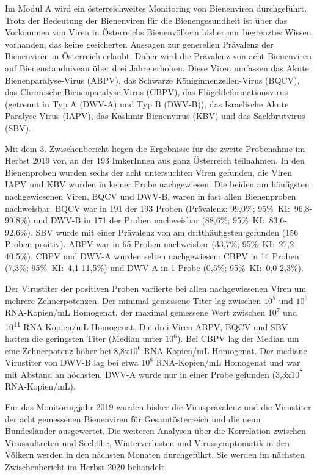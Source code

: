 Im Modul A wird ein österreichweites Monitoring von Bienenviren durchgeführt. Trotz der Bedeutung der Bienenviren für die Bienengesundheit ist über das Vorkommen von Viren in Österreichs Bienenvölkern bisher nur begrenztes Wissen vorhanden, das keine gesicherten Aussagen zur generellen Prävalenz der Bienenviren in Österreich erlaubt. Daher wird die Prävalenz von acht Bienenviren auf Bienenstandniveau über drei Jahre erhoben. Diese Viren umfassen das Akute Bienenparalyse-Virus (ABPV), das Schwarze Königinnenzellen-Virus (BQCV), das Chronische Bienenparalyse-Virus (CBPV), das Flügeldeformationsvirus (getrennt in Typ A (DWV-A) und Typ B (DWV-B)), das Israelische Akute Paralyse-Virus (IAPV), das Kashmir-Bienenvirus (KBV) und das Sackbrutvirus (SBV). 

Mit dem 3. Zwischenbericht liegen die Ergebnisse für die zweite Probenahme im Herbst 2019 vor, an der 193 ImkerInnen aus ganz Österreich teilnahmen. In den Bienenproben wurden sechs der acht untersuchten Viren gefunden, die Viren IAPV und KBV wurden in keiner Probe nachgewiesen. Die beiden am häufigsten nachgewiesenen Viren, BQCV und DWV-B, waren in fast allen Bienenproben nachweisbar. BQCV war in 191 der 193 Proben (Prävalenz: 99,0\%; 95\%~KI:~96,8-99,8\%) und DWV-B in 171 der Proben nachweisbar (88,6\%; 95\%~KI:~83,6-92,6\%). SBV wurde mit einer Prävalenz von   am dritthäufigsten gefunden (156 Proben positiv). ABPV war in 65 Proben nachweisbar (33,7\%; 95\%~KI:~27,2-40,5\%). CBPV und DWV-A wurden selten nachgewiesen: CBPV in 14 Proben (7,3\%; 95\%~KI:~4,1-11,5\%) und DWV-A in 1 Probe (0,5\%; 95\%~KI:~0,0-2,3\%). 

Der Virustiter der positiven Proben variierte bei allen nachgewiesenen Viren um mehrere Zehnerpotenzen. Der minimal gemessene Titer lag zwischen $10^5$ und $10^9$ RNA-Kopien/\si{\milli\liter} Homogenat, der maximal gemessene Wert zwischen $10^7$ und 10\textsuperscript{11} RNA-Kopien/\si{\milli\liter} Homogenat. Die drei Viren ABPV, BQCV und SBV hatten die geringsten Titer (Median unter $10^6$). Bei CBPV lag der Median um eine Zehnerpotenz höher bei 8,8x$10^6$ RNA-Kopien/\si{\milli\liter} Homogenat. Der mediane Virustiter von DWV-B lag bei etwa $10^8$ RNA-Kopien/\si{\milli\liter} Homogenat und war mit Abstand an höchsten. DWV-A wurde nur in einer Probe gefunden (3,3x$10^7$ RNA-Kopien/\si{\milli\liter}).

Für das Monitoringjahr 2019 wurden bisher die Virusprävalenz und die Virustiter der acht
gemessenen Bienenviren für Gesamtösterreich und die neun Bundesländer ausgewertet. Die
weiteren Analysen über die Korrelation zwischen Virusauftreten und Seehöhe, Winterverlusten
und Virussymptomatik in den Völkern werden in den nächsten Monaten durchgeführt. Sie
werden im nächsten Zwischenbericht im Herbst 2020 behandelt.